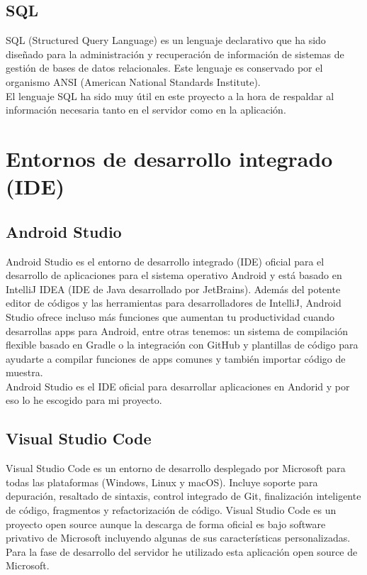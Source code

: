 \subsection{SQL}

SQL (Structured Query Language) es un lenguaje declarativo que ha sido diseñado para la administración y recuperación de información de sistemas de gestión de bases de datos relacionales. Este lenguaje es conservado por el organismo ANSI (American National Standards Institute).\\
El lenguaje SQL ha sido muy útil en este proyecto a la hora de respaldar al información necesaria tanto en el servidor como en la aplicación.



\section{Entornos de desarrollo integrado (IDE)}

\subsection{Android Studio}

Android Studio es el entorno de desarrollo integrado (IDE) oficial para el desarrollo de aplicaciones para el sistema operativo Android y está basado en IntelliJ IDEA (IDE de Java desarrollado por JetBrains). Además del potente editor de códigos y las herramientas para desarrolladores de IntelliJ, Android Studio ofrece incluso más funciones que aumentan tu productividad cuando desarrollas apps para Android, entre otras tenemos: un sistema de compilación flexible basado en Gradle o la integración con GitHub y plantillas de código para ayudarte a compilar funciones de apps comunes y también importar código de muestra.\\
Android Studio es el IDE oficial para desarrollar aplicaciones en Andorid y por eso lo he escogido para mi proyecto.

\subsection{Visual Studio Code}

Visual Studio Code es un entorno de desarrollo desplegado por Microsoft para todas las plataformas (Windows, Linux y macOS). Incluye soporte para depuración, resaltado de sintaxis, control integrado de Git, finalización inteligente de código, fragmentos y refactorización de código. Visual Studio Code es un proyecto open source aunque la descarga de forma oficial es bajo software privativo de Microsoft incluyendo algunas de sus características personalizadas.\\ 
Para la fase de desarrollo del servidor he utilizado esta aplicación open source de Microsoft.



